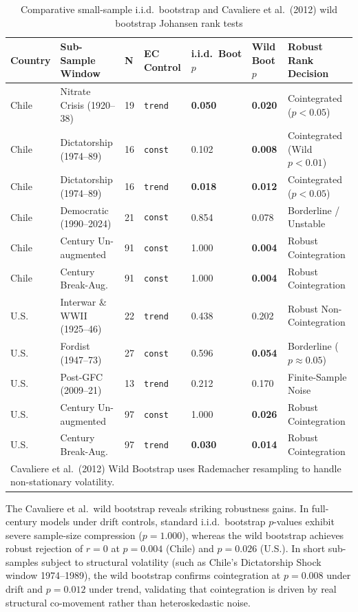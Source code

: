 \documentclass[11pt,a4paper]{article}
\begin{document}
\begin{table}[h!]
\centering
\small
\caption{Comparative small-sample i.i.d.\ bootstrap and Cavaliere et al.\ (2012) wild bootstrap Johansen rank tests}
\label{tab:vecm_bootstrap_ledger}
\begin{tabular}{p{1.4cm} p{3.2cm} p{0.6cm} p{1.4cm} p{1.6cm} p{1.6cm} p{2.8cm}}
\toprule
\textbf{Country} & \textbf{Sub-Sample Window} & \textbf{N} & \textbf{EC Control} & \textbf{i.i.d.\ Boot $p$} & \textbf{Wild Boot $p$} & \textbf{Robust Rank Decision} \\
\midrule
Chile & Nitrate Crisis (1920--38) & 19 & \texttt{trend} & \textbf{0.050} & \textbf{0.020} & Cointegrated ($p < 0.05$) \\
Chile & Dictatorship (1974--89) & 16 & \texttt{const} & 0.102 & \textbf{0.008} & Cointegrated (Wild $p < 0.01$) \\
Chile & Dictatorship (1974--89) & 16 & \texttt{trend} & \textbf{0.018} & \textbf{0.012} & Cointegrated ($p < 0.05$) \\
Chile & Democratic (1990--2024) & 21 & \texttt{const} & 0.854 & 0.078 & Borderline / Unstable \\
Chile & Century Un-augmented & 91 & \texttt{const} & 1.000 & \textbf{0.004} & Robust Cointegration \\
Chile & Century Break-Aug. & 91 & \texttt{const} & 1.000 & \textbf{0.004} & Robust Cointegration \\
\midrule
U.S. & Interwar \& WWII (1925--46) & 22 & \texttt{trend} & 0.438 & 0.202 & Robust Non-Cointegration \\
U.S. & Fordist (1947--73) & 27 & \texttt{const} & 0.596 & \textbf{0.054} & Borderline ($p \approx 0.05$) \\
U.S. & Post-GFC (2009--21) & 13 & \texttt{trend} & 0.212 & 0.170 & Finite-Sample Noise \\
U.S. & Century Un-augmented & 97 & \texttt{const} & 1.000 & \textbf{0.026} & Robust Cointegration \\
U.S. & Century Break-Aug. & 97 & \texttt{trend} & \textbf{0.030} & \textbf{0.014} & Robust Cointegration \\
\bottomrule
\multicolumn{7}{p{13.8cm}}{\footnotesize Cavaliere et al.\ (2012) Wild Bootstrap uses Rademacher resampling to handle non-stationary volatility.}
\end{tabular}
\end{table}

The Cavaliere et al.\ wild bootstrap reveals striking robustness gains. In full-century models under drift controls, standard i.i.d.\ bootstrap $p$-values exhibit severe sample-size compression ($p=1.000$), whereas the wild bootstrap achieves robust rejection of $r=0$ at $p = 0.004$ (Chile) and $p = 0.026$ (U.S.). In short sub-samples subject to structural volatility (such as Chile's Dictatorship Shock window 1974--1989), the wild bootstrap confirms cointegration at $p = 0.008$ under drift and $p = 0.012$ under trend, validating that cointegration is driven by real structural co-movement rather than heteroskedastic noise.
\end{document}
